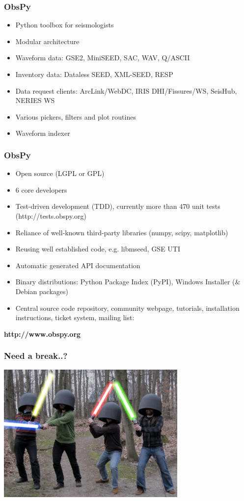 \documentclass[t,10pt,compress=false,usepdftitle=false]{beamer}
\begin{document}
\begin{frame}[fragile]
    \frametitle{ObsPy}
    \begin{itemize}
        \item Python toolbox for seismologists
        \item Modular architecture
        \item Waveform data: GSE2, MiniSEED, SAC, WAV, Q/ASCII
        \item Inventory data: Dataless SEED, XML-SEED, RESP
        \item Data request clients: ArcLink/WebDC, IRIS DHI/Fissures/WS, SeisHub, NERIES WS
        \item Various pickers, filters and plot routines
        \item Waveform indexer
    \end{itemize}
\end{frame}

\begin{frame}[fragile]
    \frametitle{ObsPy}
    \begin{itemize}
        \item Open source (LGPL or GPL)
        \item 6 core developers
        \item Test-driven development (TDD), currently more than 470 unit tests (http://tests.obspy.org)
        \item Reliance of well-known third-party libraries (numpy, scipy, matplotlib)
        \item Reusing well established code, e.g. libmseed, GSE UTI
        \item Automatic generated API documentation
        \item Binary distributions: Python Package Index (PyPI), Windows Installer (\& Debian packages)
        \item Central source code repository, community webpage, tutorials, installation instructions, ticket system, mailing list:
    \end{itemize}
    \begin{center}
    \textbf{http://www.obspy.org}
    \end{center}
\end{frame}

\begin{frame}[fragile]
    \frametitle{Need a break..?}
    \begin{center}
      \includegraphics[width=0.7\textwidth]{obstroopers.jpg}
    \end{center}
\end{frame}
\end{document}
